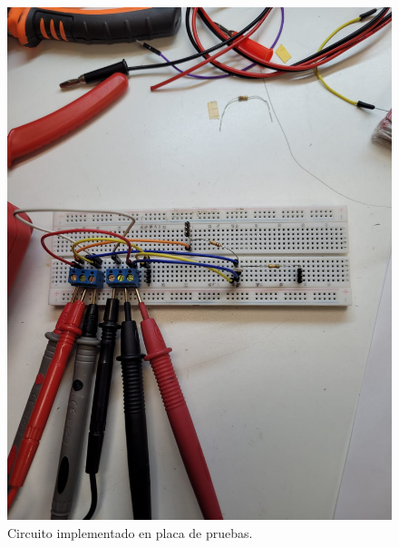 \documentclass[chaptersright]{informeutn}
\begin{document}
        \begin{figure}[H]
        \begin{minipage}{0.40\textwidth}
          \centering
          \includegraphics[width=\textwidth]{pictures/disposicion-juntura-be.jpeg}
          \caption{Circuito implementado en placa de pruebas.}
          \label{fig:disposicion-juntura-be}
        \end{minipage}
        \hfill
        \begin{minipage}{0.40\textwidth}
          \centering

\end{minipage}
\end{figure}
\end{document}
